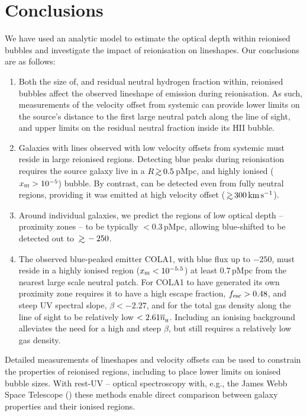 \documentclass[fleqn,usenatbib]{mnras}
\begin{document}
\section{Conclusions}
\label{sec:conc}

We have used an analytic model to estimate the \lya optical depth within reionised bubbles and investigate the impact of reionisation on \lya lineshapes. Our conclusions are as follows:

\begin{enumerate}
    \item Both the size of, and residual neutral hydrogen fraction within, reionised bubbles affect the observed lineshape of \lya emission during reionisation. As such, measurements of the \lya velocity offset from systemic can provide lower limits on the source's distance to the first large neutral patch along the line of sight, and upper limits on the residual neutral fraction inside its HII bubble.
    \item Galaxies with \lya lines observed with low velocity offsets from systemic must reside in large reionised regions. Detecting blue \lya peaks during reionisation requires the source galaxy live in a $R\simgt 0.5$\,pMpc, and highly ionised ($\xHI > 10^{-5}$) bubble. By contrast, \lya can be detected even from fully neutral regions, providing it was emitted at high velocity offset ($\simgt 300\kms$).
    \item Around individual galaxies, we predict the regions of low \lya optical depth -- proximity zones -- to be typically $<0.3$\,pMpc, allowing blue-shifted \lya to be detected out to $\simgt -250$\kms.
    \item The observed blue-peaked \lya emitter COLA1, with blue flux up to $-250$\kms, must reside in a highly ionised region ($\xHI < 10^{-5.5}$) at least 0.7\,pMpc from the nearest large scale neutral patch. For COLA1 to have generated its own proximity zone requires it to have a high escape fraction, $\fesc > 0.48$, and steep UV spectral slope, $\beta < -2.27$, and for the total gas density along the line of sight to be relatively low $<2.61\nh$. Including an ionising background alleviates the need for a high \fesc and steep $\beta$, but still requires a relatively low gas density.
\end{enumerate}

Detailed measurements of \lya lineshapes and velocity offsets can be used to constrain the properties of reionised regions, including to place lower limits on ionised bubble sizes. With rest-UV -- optical spectroscopy with, e.g., the James Webb Space Telescope (\JWST) these methods enable direct comparison between galaxy properties and their ionised regions.
\end{document}
